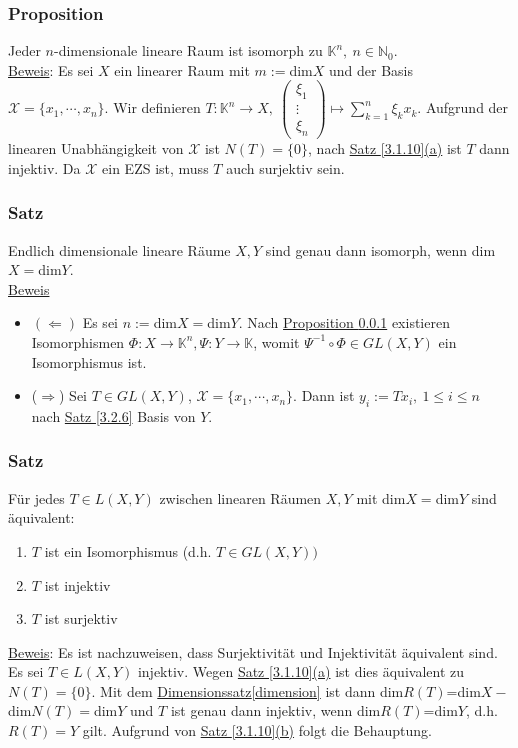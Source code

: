 \subsubsection{Proposition}
\label{3.2.8}
Jeder $n$-dimensionale lineare Raum ist isomorph zu $\mathbb{K}^n,\ n\in\mathbb{N}_0$.\\
\underline{Beweis}: Es sei $X$ ein linearer Raum mit $m:=$dim$X$ und der Basis $\mathcal{X}=\{x_1,\cdots ,x_n\}$.  Wir definieren $T:\mathbb{K}^n\rightarrow X,\ \begin{pmatrix}\xi _1\\ \vdots \\ \xi _n\end{pmatrix}\mapsto \sum_{k=1}^n\xi _k x_k$.  Aufgrund der linearen Unabhängigkeit von $\mathcal{X}$ ist $N(T)=\{0\}$, nach \hyperref[3.1.10]{Satz \ref*{3.1.10}(a)} ist $T$ dann injektiv.  Da $\mathcal{X}$ ein EZS ist, muss $T$ auch surjektiv sein.
\subsubsection{Satz}
Endlich dimensionale lineare Räume $X,Y$ sind genau dann isomorph, wenn dim$X=$dim$Y$.\\
\underline{Beweis}
\begin{itemize}
\item $(\Leftarrow )$ Es sei $n:=$dim$X=$dim$Y$.  Nach \hyperref[3.2.8]{Proposition \ref*{3.2.8}} existieren Isomorphismen $\Phi :X\rightarrow\mathbb{K}^n,\Psi :Y\rightarrow \mathbb{K}$, womit $\Psi ^{-1} \circ \Phi \in GL(X,Y)$ ein Isomorphismus ist.
\item ($\Rightarrow$) Sei $T\in GL(X,Y)$, $\mathcal{X}=\{x_1,\cdots ,x_n\}$.  Dann ist $y_i:=Tx_i,\ 1\leq i\leq n$ nach \hyperref[3.2.6]{Satz \ref*{3.2.6}} Basis von $Y$.
\end{itemize}
\subsubsection{Satz}
\label{3.2.10}
Für jedes $T\in L(X,Y)$ zwischen linearen Räumen $X,Y$ mit dim$X=$dim$Y$ sind äquivalent:
\renewcommand{\labelenumi}{(\alph{enumi})}
\begin{enumerate}
\item $T$ ist ein Isomorphismus (d.h. $T\in GL(X,Y))$
\item $T$ ist injektiv
\item $T$ ist surjektiv
\end{enumerate}
\underline{Beweis}: Es ist nachzuweisen, dass Surjektivität und Injektivität äquivalent sind.  Es sei $T\in L(X,Y)$ injektiv.  Wegen \hyperref[3.1.10]{Satz \ref*{3.1.10}(a)} ist dies äquivalent zu $N(T)=\{0\}$.  Mit dem  \hyperref[dimension]{Dimensionssatz\ref*{dimension}} ist dann dim$R(T)$=dim$X-$dim$N(T)=$dim$Y$ und $T$ ist genau dann injektiv, wenn dim$R(T)$=dim$Y$, d.h. $R(T)=Y$ gilt.  Aufgrund von \hyperref[3.1.10]{Satz \ref*{3.1.10}(b)} folgt die Behauptung.
